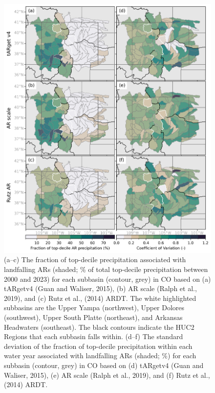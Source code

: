 \documentclass[draft]{agujournal2019}
\begin{document}
\begin{figure}
\noindent\includegraphics[width=\textwidth, height=\textheight, keepaspectratio]{fig9.png}
\caption{(a–c) The fraction of top-decile precipitation associated with landfalling ARs (shaded; \% of total top-decile precipitation between 2000 and 2023) for each subbasin (contour, grey) in CO based on (a) tARgetv4 (Guan and Waliser, 2015), (b) AR scale (Ralph et al., 2019), and (c) Rutz et al., (2014) ARDT. The white highlighted subbasins are the Upper Yampa (northwest), Upper Dolores (southwest), Upper South Platte (northeast), and Arkansas Headwaters (southeast). The black contours indicate the HUC2 Regions that each subbasin falls within. (d–f) The standard deviation of the fraction of top-decile precipitation within each water year associated with landfalling ARs (shaded; \%) for each subbasin (contour, grey) in CO based on (d)  tARgetv4 (Guan and Waliser, 2015), (e) AR scale (Ralph et al., 2019), and (f) Rutz et al., (2014) ARDT. }
\label{fig:choropleth}
\end{figure}
\end{document}
